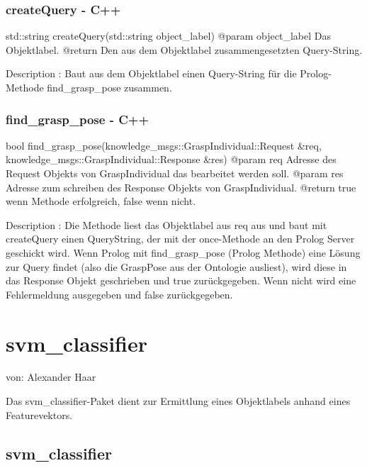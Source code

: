 \documentclass{suturo}
\makeatletter
\newcommand{\chapterauthor}[1]{%
  {\parindent0pt\vspace*{-27pt}%
  \linespread{0}\small\begin{flushright}von: #1\end{flushright}%
  \par\nobreak\vspace*{0pt}}
  \@afterheading%
}
\makeatother
\begin{document}
\subsubsection{createQuery - C++}
\begin{spverbatim}
std::string createQuery(std::string object_label)
@param object_label Das Objektlabel.
@return Den aus dem Objektlabel zusammengesetzten Query-String.

Description : Baut aus dem Objektlabel einen Query-String für die 
Prolog-Methode find_grasp_pose zusammen.
\end{spverbatim}

\subsubsection{find\_grasp\_pose - C++}
\begin{spverbatim}
bool find_grasp_pose(knowledge_msgs::GraspIndividual::Request  &req, 
                             knowledge_msgs::GraspIndividual::Response &res)
@param req Adresse des Request Objekts von GraspIndividual das bearbeitet 
           werden soll.
@param res Adresse zum schreiben des Response Objekts von GraspIndividual.
@return true wenn Methode erfolgreich, false wenn nicht.

Description : Die Methode liest das Objektlabel aus req aus und baut mit 
createQuery einen QueryString, der mit der once-Methode an den Prolog Server 
geschickt wird. Wenn Prolog mit find_grasp_pose (Prolog Methode) eine Lösung 
zur Query findet (also die GraspPose aus der Ontologie ausliest), wird diese in 
das Response Objekt geschrieben und true zurückgegeben. Wenn nicht wird 
eine Fehlermeldung ausgegeben und false zurückgegeben.
\end{spverbatim}

\section{svm\_classifier}
\chapterauthor{Alexander Haar}
Das svm\_classifier-Paket dient zur Ermittlung eines Objektlabels anhand eines Featurevektors.

\subsection{svm\_classifier}
\begin{figure}[!htb]
\end{figure}
\end{document}

